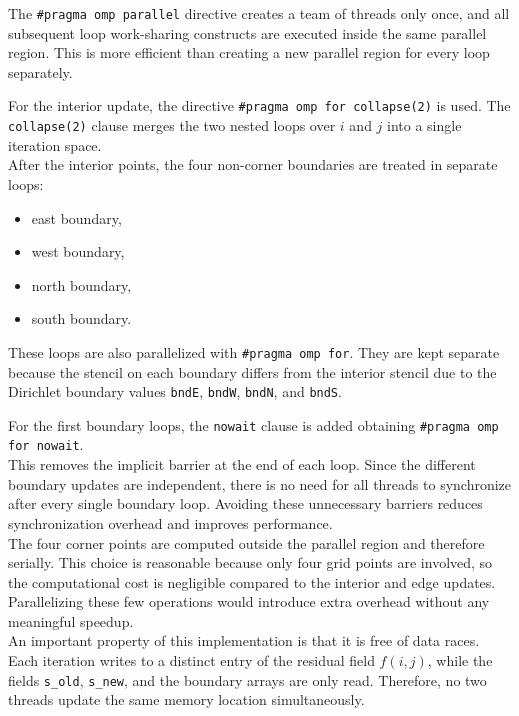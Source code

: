 \documentclass[unicode,10pt,a4paper,oneside,numbers=endperiod,openany]{scrartcl}
\begin{document}
The \texttt{\#pragma omp parallel} directive creates a team of threads only once, and all subsequent loop work-sharing constructs are executed inside the same parallel region.  
This is more efficient than creating a new parallel region for every loop separately.

For the interior update, the directive \texttt{\#pragma omp for collapse(2)} is used.  
The \texttt{collapse(2)} clause merges the two nested loops over \(i\) and \(j\) into a single iteration space.\\

After the interior points, the four non-corner boundaries are treated in separate loops:
\begin{itemize}
    \item east boundary,
    \item west boundary,
    \item north boundary,
    \item south boundary.
\end{itemize}
These loops are also parallelized with \texttt{\#pragma omp for}.  
They are kept separate because the stencil on each boundary differs from the interior stencil due to the Dirichlet boundary values \texttt{bndE}, \texttt{bndW}, \texttt{bndN}, and \texttt{bndS}.

For the first boundary loops, the \texttt{nowait} clause is added obtaining \texttt{\#pragma omp for nowait}.\\
This removes the implicit barrier at the end of each loop.  
Since the different boundary updates are independent, there is no need for all threads to synchronize after every single boundary loop.  
Avoiding these unnecessary barriers reduces synchronization overhead and improves performance.\\

The four corner points are computed outside the parallel region and therefore serially.  
This choice is reasonable because only four grid points are involved, so the computational cost is negligible compared to the interior and edge updates.  
Parallelizing these few operations would introduce extra overhead without any meaningful speedup.\\

An important property of this implementation is that it is free of data races.  
Each iteration writes to a distinct entry of the residual field \(f(i,j)\), while the fields \texttt{s\_old}, \texttt{s\_new}, and the boundary arrays are only read.  
Therefore, no two threads update the same memory location simultaneously.
\end{document}

